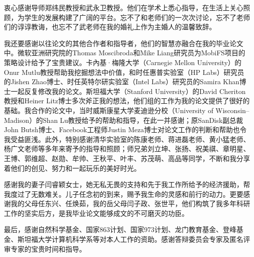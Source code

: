 
\begin{ack}

衷心感谢导师郑纬民教授和武永卫教授。他们在学术上悉心指导，在生活上关心照顾，为学生的发展构建了广阔的平台。忘不了和老师们的一次次讨论，忘不了老师们的谆谆教诲，也忘不了武老师在我的婚礼上作为主婚人的温馨致辞。

我还要感谢以往论文的其他合作者和指导者，他们的智慧亦融合在我的毕业论文中。微软亚洲研究院的Thomas Moscibroda和Mike Liang研究员为MobiFS项目的策略设计给予了宝贵建议。卡內基·梅隆大学（Carnegie Mellon University）的Onur Mutlu教授帮助我挖掘想法中价值，和时任惠普实验室（HP Labs）研究员的Jishen Zhao博士、时任英特尔研实验室（Intel Labs）研究员的Samira Khan博士一起反复修改我的论文。斯坦福大学（Stanford University）的David Cheriton教授和Heiner Litz博士多次斧正我的想法，他们组的工作为我的论文提供了很好的基础。我合作的论文中，当时威斯康星大学麦迪逊分校（University of Wisconsin–Madison）的Shan Lu教授给予的帮助和指导，在此一并感谢；原SanDisk副总裁John Butsh博士、Facebook工程师Justin Meza博士对论文工作的判断和帮助也令我受益匪浅。此外，特别感谢清华实验室的陈康老师、蒋进磊老师、黄小猛老师、杨广文老师等多年来寄予的指导和照顾；师兄弟刘立坤、张扬、祝美祺、章明星、王博、郭维超、赵勋、牟帅、王秋平、叶丰、苏茂萌、高品等同学，不断和我分享着他们的创见、努力和一起玩乐的美好时光。

感谢我的妻子闫睿颖女士，她无私无畏的支持和先于我工作所给予的经济援助，帮我度过了无数难关。儿子任念初的到来，赐予我生命的灵感和前行的动力。更要感谢我的父母任东兴、任焕茹，我的岳父母闫子政、张世平，他们构筑了我多年科研工作的坚实后方，是我毕业论文能够成文的不可磨灭的功臣。

最后，感谢自然科学基金、国家863计划、国家973计划、龙门教育基金、登峰基金、斯坦福大学计算机科学系等对本人工作的资助。感谢答辩委员会专家及匿名评审专家的宝贵时间和指导。

\end{ack}
